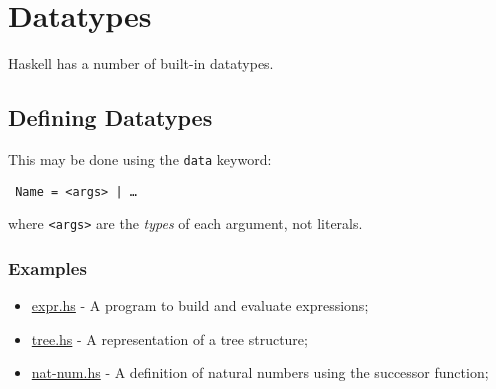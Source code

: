 \section{Datatypes}

Haskell has a number of built-in datatypes.

\subsection{Defining Datatypes}
This may be done using the \texttt{data} keyword:
\begin{center}
  \texttt{ Name =  <args> | \ldots}
\end{center}
where \texttt{<args>} are the \textit{types} of each argument, not literals.

\subsubsection{Examples}
\begin{itemize}
  \item \url{expr.hs} - A program to build and evaluate expressions;
  \item \url{tree.hs} - A representation of a tree structure;
  \item \url{nat-num.hs} - A definition of natural numbers using the successor function;
\end{itemize}